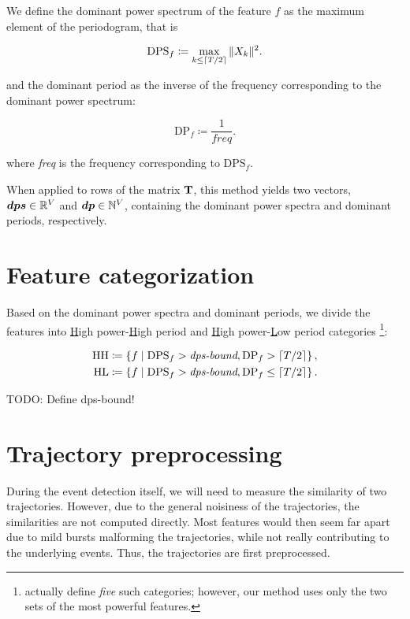 We define the dominant power spectrum of the feature $f$ as the maximum element of the periodogram, that is

\begin{equation}
	\text{DPS}_{f} \coloneqq \max_{k \leq \lceil T / 2\rceil}{\|X_{k}\|^{2}}.
\end{equation}

and the dominant period as the inverse of the frequency corresponding to the dominant power spectrum:

\begin{equation}
	\text{DP}_{f} \coloneqq \frac{1}{\mathit{freq}}.
\end{equation}

where \textit{freq} is the frequency corresponding to $\text{DPS}_{f}$.

When applied to rows of the matrix $\mathbf{T}$, this method yields two vectors, $\vect{DPS} \in \R^{\featcount}$ and $\vect{DP} \in \N^{\featcount}$, containing the dominant power spectra and dominant periods, respectively.


\section{Feature categorization}
Based on the dominant power spectra and dominant periods, we divide the features into \underline{H}igh power-\underline{H}igh period and \underline{H}igh power-\underline{L}ow period categories \footnote{\cite{event-detection} actually define \textit{five} such categories; however, our method uses only the two sets of the most powerful features.}:

\begin{equation}
\begin{split}
	\text{HH} \coloneqq \left\{ f \mid \text{DPS}_{f} > \textit{dps-bound}, \text{DP}_{f} > \lceil T / 2\rceil \right\}, \\
	\text{HL} \coloneqq \left\{ f \mid \text{DPS}_{f} > \textit{dps-bound}, \text{DP}_{f} \leq \lceil T / 2\rceil \right\}.
\end{split}
\end{equation}

{\color{red}TODO: Define dps-bound!}


\section{Trajectory preprocessing}
During the event detection itself, we will need to measure the similarity of two trajectories. However, due to the general noisiness of the trajectories, the similarities are not computed directly. Most features would then seem far apart due to mild bursts malforming the trajectories, while not really contributing to the underlying events. Thus, the trajectories are first preprocessed.

